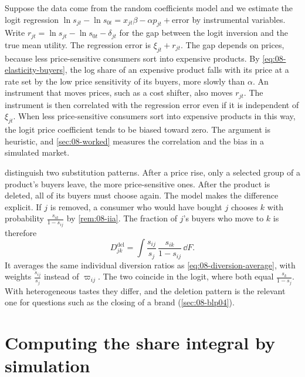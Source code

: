 \begin{remark}\label{rem:08-logit-misspec}
Suppose the data come from the random coefficients model and we estimate the logit regression $\ln s_{jt} -
\ln s_{0t} = x_{jt}\beta - \alpha p_{jt} + \text{error}$ by instrumental variables. Write $r_{jt} = \ln s_{jt} -
\ln s_{0t} - \delta_{jt}$ for the gap between the logit inversion and the true mean utility. The regression error is
$\xi_{jt} + r_{jt}$. The gap depends on prices, because less price-sensitive consumers sort into expensive
products. By \eqref{eq:08-elasticity-buyers}, the log share of an expensive product falls with its price at a rate
set by the low price sensitivity of its buyers, more slowly than $\alpha$. An instrument that moves prices, such
as a cost shifter, also moves $r_{jt}$. The instrument is then correlated with the regression error even if it is
independent of $\xi_{jt}$. When less price-sensitive consumers sort into expensive products in this way, the
logit price coefficient tends to be biased toward zero. The argument is heuristic, and \cref{sec:08-worked}
measures the correlation and the bias in a simulated market.
\end{remark}

\begin{remark}\label{rem:08-deletion}
\citet[p.~94]{BerryLevinsohnPakes2004} distinguish two substitution patterns. After a price rise, only a selected
group of a product's buyers leave, the more price-sensitive ones. After the product is deleted, all of its buyers
must choose again. The model makes the difference explicit. If $j$ is removed, a consumer who would have bought $j$
chooses $k$ with probability $\frac{s_{ik}}{1 - s_{ij}}$ by \cref{rem:08-iia}. The fraction of $j$'s buyers who move
to $k$ is therefore
\begin{equation}\label{eq:08-deletion-diversion}
  D^{\text{del}}_{jk} = \int \frac{s_{ij}}{s_j}\, \frac{s_{ik}}{1 - s_{ij}}\, \dd F.
\end{equation}
It averages the same individual diversion ratios as \eqref{eq:08-diversion-average}, with weights
$\frac{s_{ij}}{s_j}$ instead of $\varpi_{ij}$. The two coincide in the logit, where both equal $\frac{s_k}{1 -
s_j}$. With heterogeneous tastes they differ, and the deletion pattern is the relevant one for questions such as the
closing of a brand (\cref{sec:08-blp04}).
\end{remark}

\section{Computing the share integral by simulation}\label{sec:08-simulation}

